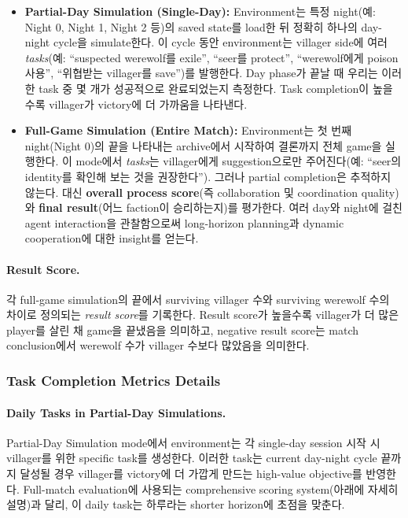 \begin{itemize}
    \item \textbf{Partial-Day Simulation (Single-Day):}
    Environment는 특정 night(예: Night 0, Night 1, Night 2 등)의 saved state를 load한 뒤 정확히 하나의 day-night cycle을 simulate한다. 이 cycle 동안 environment는 villager side에 여러 \emph{tasks}(예: ``suspected werewolf를 exile'', ``seer를 protect'', ``werewolf에게 poison 사용'', ``위협받는 villager를 save'')를 발행한다. Day phase가 끝날 때 우리는 이러한 task 중 몇 개가 성공적으로 완료되었는지 측정한다. Task completion이 높을수록 villager가 victory에 더 가까움을 나타낸다.

    \item \textbf{Full-Game Simulation (Entire Match):}
    Environment는 첫 번째 night(Night 0)의 끝을 나타내는 archive에서 시작하여 결론까지 전체 game을 실행한다. 이 mode에서 \emph{tasks}는 villager에게 suggestion으로만 주어진다(예: ``seer의 identity를 확인해 보는 것을 권장한다''). 그러나 partial completion은 추적하지 않는다. 대신 \textbf{overall process score}(즉 collaboration 및 coordination quality)와 \textbf{final result}(어느 faction이 승리하는지)를 평가한다. 여러 day와 night에 걸친 agent interaction을 관찰함으로써 long-horizon planning과 dynamic cooperation에 대한 insight를 얻는다.
\end{itemize}
\paragraph{Result Score.}
각 full-game simulation의 끝에서 surviving villager 수와 surviving werewolf 수의 차이로 정의되는 \emph{result score}를 기록한다. Result score가 높을수록 villager가 더 많은 player를 살린 채 game을 끝냈음을 의미하고, negative result score는 match conclusion에서 werewolf 수가 villager 수보다 많았음을 의미한다.
\subsubsection{Task Completion Metrics Details}

\paragraph{Daily Tasks in Partial-Day Simulations.}
\label{sec:partial-day-tasks}
Partial-Day Simulation mode에서 environment는 각 single-day session 시작 시 villager를 위한 specific task를 생성한다. 이러한 task는 current day-night cycle 끝까지 달성될 경우 villager를 victory에 더 가깝게 만드는 high-value objective를 반영한다. Full-match evaluation에 사용되는 comprehensive scoring system(아래에 자세히 설명)과 달리, 이 daily task는 하루라는 shorter horizon에 초점을 맞춘다.

